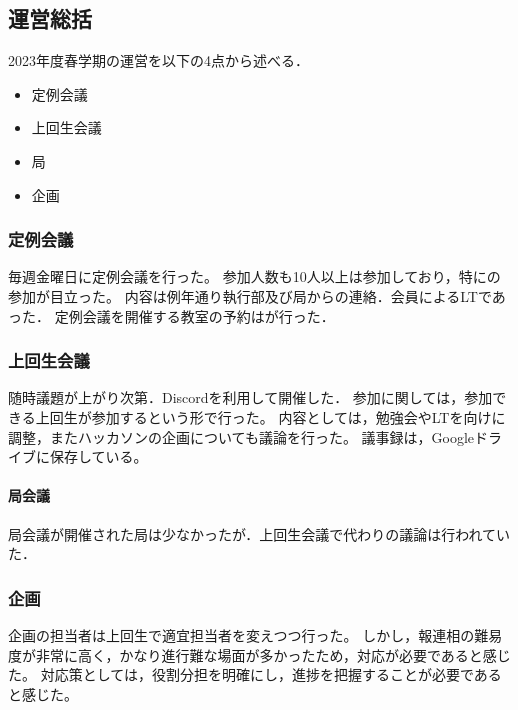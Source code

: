 \subsection*{運営総括}


2023年度春学期の運営を以下の4点から述べる．
\begin{itemize}
    \item 定例会議
    \item 上回生会議
    \item 局
    \item 企画
\end{itemize}

\subsubsection*{定例会議}
毎週金曜日に定例会議を行った。
参加人数も10人以上は参加しており，特に\firstGrade{}の参加が目立った。
内容は例年通り執行部及び局からの連絡．会員によるLTであった．
定例会議を開催する教室の予約は\kensuiChief{}が行った．

\subsubsection*{上回生会議}
随時議題が上がり次第．Discordを利用して開催した．
参加に関しては，参加できる上回生が参加するという形で行った。
内容としては，勉強会やLTを\firstGrade{}向けに調整，またハッカソンの企画についても議論を行った。
議事録は，Googleドライブに保存している。

\paragraph*{局会議}
局会議が開催された局は少なかったが．上回生会議で代わりの議論は行われていた．

\subsubsection*{企画}
企画の担当者は上回生で適宜担当者を変えつつ行った。
しかし，報連相の難易度が非常に高く，かなり進行難な場面が多かったため，対応が必要であると感じた。
対応策としては，役割分担を明確にし，進捗を把握することが必要であると感じた。